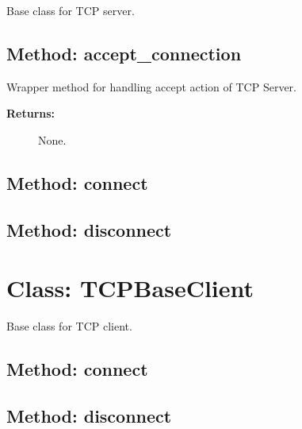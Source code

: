 Base class for TCP server.

\hypertarget{qconnectbase-tcp-tcp-base-method-accept_connection-71}{%
\subsection{Method: accept\_connection}\label{qconnectbase-tcp-tcp-base-method-accept_connection-71}}

Wrapper method for handling accept action of TCP Server.

\begin{description}
\item[\textbf{Returns:}]
None.
\end{description}

\hypertarget{qconnectbase-tcp-tcp-base-method-connect-1-72}{%
\subsection{Method: connect}\label{qconnectbase-tcp-tcp-base-method-connect-1-72}}

\hypertarget{qconnectbase-tcp-tcp-base-method-disconnect-1-73}{%
\subsection{Method: disconnect}\label{qconnectbase-tcp-tcp-base-method-disconnect-1-73}}

\hypertarget{qconnectbase-tcp-tcp-base-class-tcpbaseclient-74}{%
\section{Class: TCPBaseClient}\label{qconnectbase-tcp-tcp-base-class-tcpbaseclient-74}}

\begin{Shaded}
\begin{Highlighting}[]
\end{Highlighting}
\end{Shaded}

Base class for TCP client.

\hypertarget{qconnectbase-tcp-tcp-base-method-connect-2-75}{%
\subsection{Method: connect}\label{qconnectbase-tcp-tcp-base-method-connect-2-75}}

\hypertarget{qconnectbase-tcp-tcp-base-method-disconnect-2-76}{%
\subsection{Method: disconnect}\label{qconnectbase-tcp-tcp-base-method-disconnect-2-76}}
